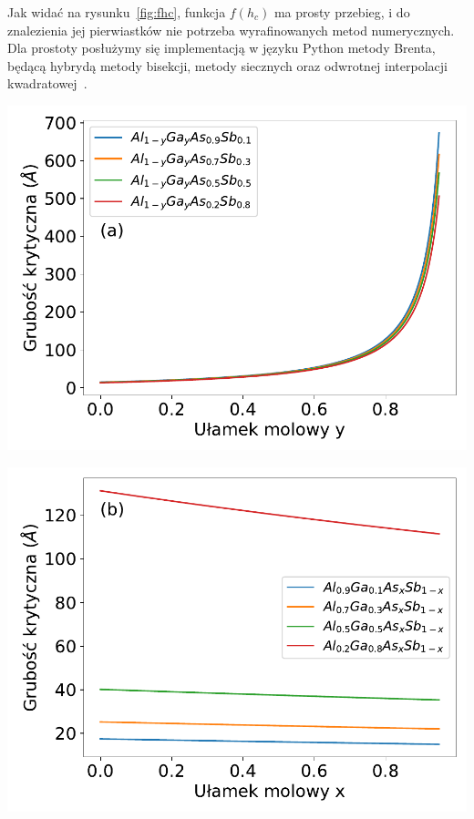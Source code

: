 \documentclass[12pt,openany,a4paper]{book}
\begin{document}
Jak widać na rysunku~\ref{fig:fhc}, funkcja \(f(h_c)\) ma prosty przebieg, i do znalezienia jej pierwiastków
nie potrzeba wyrafinowanych metod numerycznych. Dla prostoty posłużymy się implementacją w języku Python metody Brenta, będącą hybrydą metody
bisekcji, metody siecznych oraz odwrotnej interpolacji kwadratowej~\autocite{Brent1974}.

\begin{minipage}[t]{0.5\textwidth}
	\includegraphics[width = \linewidth]{Figures/thickness/fix_x.pdf}\label{fig:hcx}
\end{minipage}
\begin{minipage}[t]{0.5\textwidth}
	\includegraphics[width = \linewidth]{Figures/thickness/fix_y.pdf}\label{fig:hcy}
\end{minipage}
\begin{center}
\label{fig:hc}
\end{center}
\end{document}
